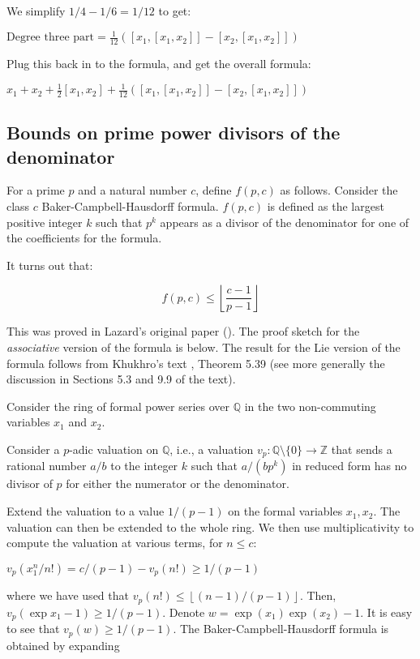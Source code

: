 We simplify $1/4 - 1/6 = 1/12$ to get:

$\mbox{Degree three part} = \frac{1}{12}([x_1,[x_1,x_2]] - [x_2,[x_1,x_2]])$

Plug this back in to the formula, and get the overall formula:

$x_1 + x_2 + \frac{1}{2}[x_1,x_2] + \frac{1}{12}([x_1,[x_1,x_2]] - [x_2,[x_1,x_2]])$

\subsection{Bounds on prime power divisors of the denominator}\label{appsec:bch-prime-power-divisor-bound}

For a prime $p$ and a natural number $c$, define $f(p,c)$ as
follows. Consider the class $c$ Baker-Campbell-Hausdorff
formula. $f(p,c)$ is defined as the largest positive integer $k$ such
that $p^k$ appears as a divisor of the denominator for one of the
coefficients for the formula.

It turns out that:

$$f(p,c) \le \left \lfloor \frac{c - 1}{p - 1} \right \rfloor$$

This was proved in Lazard's original paper (\cite{Lazardsoriginal}).
The proof sketch for the {\em associative} version of the formula is
below. The result for the Lie version of the formula follows from
Khukhro's text \cite{Khukhro}, Theorem 5.39 (see more generally the
discussion in Sections 5.3 and 9.9 of the text).

Consider the ring of formal power series over $\mathbb{Q}$ in the two non-commuting variables $x_1$ and $x_2$.

Consider a $p$-adic valuation on $\mathbb{Q}$, i.e., a valuation $v_p: \mathbb{Q} \setminus \{ 0 \} \to \mathbb{Z}$ that sends a rational number $a/b$ to the integer $k$ such that $a/(bp^k)$ in reduced form has no divisor of $p$ for either the numerator or the denominator.

Extend the valuation to a value $1/(p-1)$ on the formal variables
$x_1,x_2$. The valuation can then be extended to the whole ring. We
then use multiplicativity to compute the valuation at various terms,
for $n \le c$:

$\! v_p(x_1^n/n!)=c/(p-1) - v_p(n!) \geq 1/(p-1)$

where we have used that $v_p(n!) \leq
\left \lfloor(n-1)/(p-1)\right\rfloor$. Then, $v_p(\exp x_1 - 1)\geq
1/(p-1)$. Denote $w = \exp(x_1)\exp(x_2) - 1$. It is easy to see that
$v_p(w) \geq 1/(p-1)$. The Baker-Campbell-Hausdorff formula is
obtained by expanding

